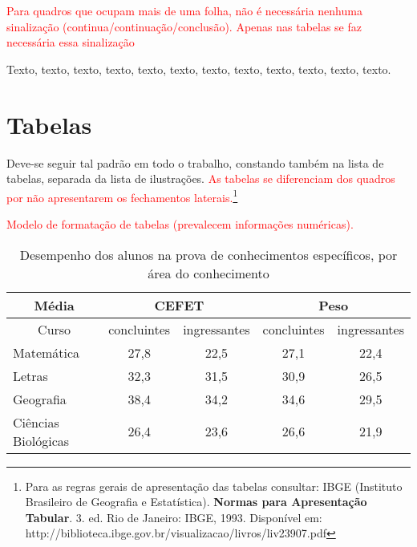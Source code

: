 \textcolor{red}{Para quadros que ocupam mais de uma folha, não é necessária nenhuma sinalização (continua/continuação/conclusão). Apenas nas tabelas se faz necessária essa sinalização}

Texto, texto, texto, texto, texto, texto, texto, texto, texto, texto, texto, texto.

\newpage

\section{Tabelas}

Deve-se seguir tal padrão em todo o trabalho, constando também na lista de tabelas, separada da lista de ilustrações. \textcolor{red}{As tabelas se diferenciam dos quadros por não apresentarem os fechamentos laterais.}\footnote{Para as regras gerais de apresentação das tabelas consultar: IBGE (Instituto Brasileiro de Geografia e Estatística). \textbf{Normas para Apresentação Tabular}. 3. ed. Rio de Janeiro: IBGE, 1993. Disponível em: http://biblioteca.ibge.gov.br/visualizacao/livros/liv23907.pdf
}

\vspace{1cm}

\textcolor{red}{Modelo de formatação de tabelas (prevalecem informações numéricas).}


\begin{table}[!htb]
 \captionsetup{width=0.83\textwidth}
 \centering
 \caption{\label{tab:exemplo1}Desempenho dos alunos na prova de conhecimentos específicos, por área do conhecimento}
 \begin{tabular}{p{6cm} cccc}
 	\hline
 	    \multicolumn{1}{c}{\textbf{Média}} & \multicolumn{2}{c}{\textbf{CEFET}} & \multicolumn{2}{c}{\textbf{Peso}} \\ \hline
            \multicolumn{1}{c}{Curso}     & concluintes & ingressantes & concluintes & ingressantes   \\ \hline
            Matemática	    & 27,8	      & 22,5	     & 27,1	        & 22,4 \\
            Letras	        & 32,3	      & 31,5	     & 30,9	         & 26,5 \\
            Geografia	    & 38,4	      & 34,2	     &34,6           &	29,5 \\
            Ciências Biológicas&	26,4  &23,6	         & 26,6	         & 21,9\\ \hline
 \end{tabular}
 \end{table}


